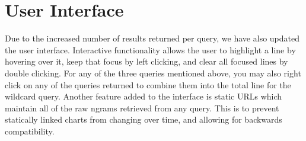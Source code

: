 \documentclass[11pt,a4paper]{article}
\begin{document}
\section{User Interface}
\label{sec:interface}
Due to the increased number of results returned per query, we have also updated the user interface. Interactive functionality allows the user to highlight a line by hovering over it, keep that focus by left clicking, and clear all focused lines by double clicking. For any of the three queries mentioned above, you may also right click on any of the queries returned to combine them into the total line for the wildcard query. Another feature added to the interface is static URLs which maintain all of the raw ngrams retrieved from any query. This is to prevent statically linked charts from changing over time, and allowing for backwards compatibility.

\begin{figure}
\centering
\addtolength{\subfigcapskip}{-0.2cm}
\hspace*{-0.5cm}
\hspace*{0.1cm}

\hspace*{-0.5cm}\vspace*{-0.5cm}
\hspace*{0.1cm}
\parbox[b][]{.28\textwidth}%
{}
\end{figure}
\end{document}

